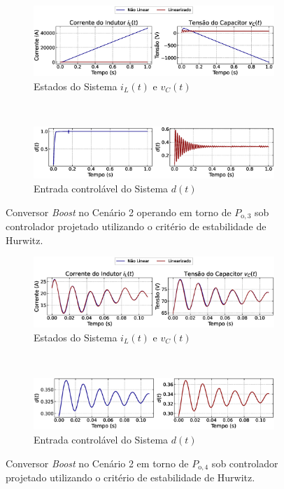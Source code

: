 \begin{figure}[H]
  \centering
  \captionsetup{justification=centering}
  \begin{subfigure}{1.\textwidth}
    \centering
    \includegraphics[width=1.\textwidth]{figuras/classic/boost/sim2/op1/result.eps}
    \caption{Estados do Sistema $i_L(t)$  e $v_C(t)$}
  \end{subfigure}
  \\[6pt]
  \begin{subfigure}{1.\textwidth}
    \centering
    \includegraphics[width=1.\textwidth]{figuras/classic/boost/sim2/op1/duty-cycle.eps}
    \caption{Entrada controlável do Sistema $d(t)$}
  \end{subfigure}
  \caption{Conversor \textit{Boost }no Cenário 2 operando em torno de $P_{\mathrm{o}, 3}$ sob controlador projetado utilizando o critério de estabilidade de Hurwitz.}
  \label{fig:classic_boost_cen2_op1}
  \begin{subfigure}{1.\textwidth}
    \centering
    \includegraphics[width=1.\textwidth]{figuras/classic/boost/sim2/op2/result.eps}
    \caption{Estados do Sistema $i_L(t)$  e $v_C(t)$}
  \end{subfigure}
  \\[6pt]
  \begin{subfigure}{1.\textwidth}
    \centering
    \includegraphics[width=1.\textwidth]{figuras/classic/boost/sim2/op2/duty-cycle.eps}
    \caption{Entrada controlável do Sistema $d(t)$}
  \end{subfigure}
  \caption{Conversor \textit{Boost }no Cenário 2 em torno de $P_{\mathrm{o}, 4}$ sob controlador projetado utilizando o critério de estabilidade de Hurwitz.}
  \label{fig:classic_boost_cen2_op2}
\end{figure}


